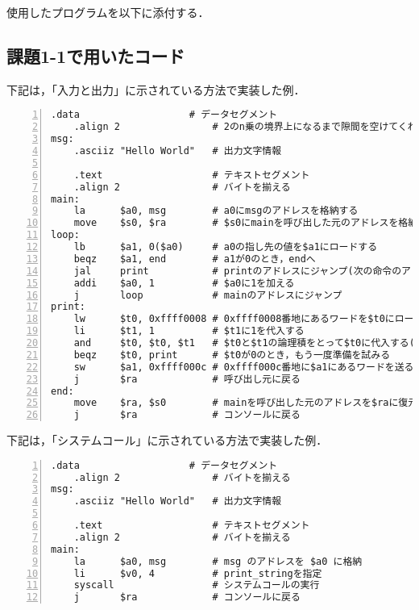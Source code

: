 使用したプログラムを以下に添付する．



\subsection{課題1-1で用いたコード} \label{sec:p1-1}
下記は，「入力と出力」に示されている方法で実装した例．
\begin{Verbatim}[numbers=left, xleftmargin=10mm, numbersep=6pt,
                    fontsize=\small, baselinestretch=0.8]
    .data                   # データセグメント
    .align 2                # 2のn乗の境界上になるまで隙間を空けてくれる
msg:
    .asciiz "Hello World"   # 出力文字情報

    .text                   # テキストセグメント
    .align 2                # バイトを揃える
main:
    la      $a0, msg        # a0にmsgのアドレスを格納する
    move    $s0, $ra        # $s0にmainを呼び出した元のアドレスを格納
loop:
    lb      $a1, 0($a0)     # a0の指し先の値を$a1にロードする
    beqz    $a1, end        # a1が0のとき，endへ
    jal     print           # printのアドレスにジャンプ(次の命令のアドレスを$raに)
    addi    $a0, 1          # $a0に1を加える
    j       loop            # mainのアドレスにジャンプ
print:
    lw      $t0, 0xffff0008 # 0xffff0008番地にあるワードを$t0にロードする
    li      $t1, 1          # $t1に1を代入する
    and     $t0, $t0, $t1   # $t0と$t1の論理積をとって$t0に代入する($t0が1か確認する)
    beqz    $t0, print      # $t0が0のとき，もう一度準備を試みる
    sw      $a1, 0xffff000c # 0xffff000c番地に$a1にあるワードを送る
    j       $ra             # 呼び出し元に戻る
end:
    move    $ra, $s0        # mainを呼び出した元のアドレスを$raに復元
    j       $ra             # コンソールに戻る
\end{Verbatim}

下記は，「システムコール」に示されている方法で実装した例．
\begin{Verbatim}[numbers=left, xleftmargin=10mm, numbersep=6pt,
                    fontsize=\small, baselinestretch=0.8]
    .data                   # データセグメント
    .align 2                # バイトを揃える
msg:
    .asciiz "Hello World"   # 出力文字情報

    .text                   # テキストセグメント
    .align 2                # バイトを揃える
main:
    la      $a0, msg        # msg のアドレスを $a0 に格納
    li      $v0, 4          # print_stringを指定
    syscall                 # システムコールの実行
    j       $ra             # コンソールに戻る
\end{Verbatim}

